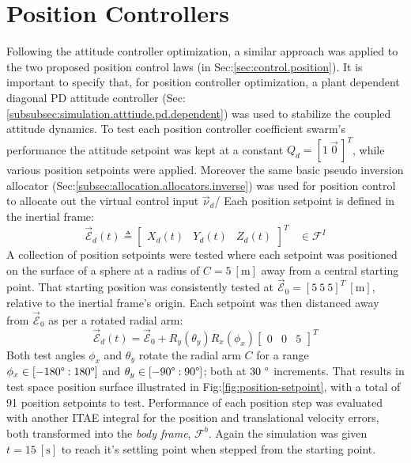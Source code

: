 \section{Position Controllers}
\label{sec:simulation.position}
Following the attitude controller optimization, a similar approach was applied to the two proposed position control laws (in Sec:\ref{sec:control.position}). It is important to specify that, for position controller optimization, a plant dependent diagonal PD attitude controller (Sec:\ref{subsubsec:simulation.atttiude.pd.dependent}) was used to stabilize the coupled attitude dynamics. To test each position controller coefficient swarm's performance the attitude setpoint was kept at a constant $Q_d=[1~\vec{0}\hspace{2pt}]^T$, while various position setpoints were applied. Moreover the same basic pseudo inversion allocator (Sec:\ref{subsec:allocation.allocators.inverse}) was used for position control to allocate out the virtual control input $\vec{\nu}_d$/ Each position setpoint is defined in the inertial frame:
\begin{equation}
\vec{\mathcal{E}}_d(t)\triangleq\begin{bmatrix}
X_d(t)&
Y_d(t)&
Z_d(t)
\end{bmatrix}^T
~~~~\in\mathcal{F}^{I}
\end{equation}
A collection of position setpoints were tested where each setpoint was positioned on the surface of a sphere at a radius of $C=5~[\text{m}]$ away from a central starting point. That starting position was consistently tested at $\vec{\mathcal{E}}_0=[5~5~5]^{T}~[\text{m}]$, relative to the inertial frame's origin. Each setpoint was then distanced away from $\vec{\mathcal{E}}_0$ as per a rotated radial arm:
\begin{equation}
\vec{\mathcal{E}}_d(t)=\vec{\mathcal{E}}_0+R_y(\theta_{y})R_x(\phi_{x})\begin{bmatrix}
0 & 0 & 5
\end{bmatrix}^T
\end{equation}
Both test angles $\phi_x$ and $\theta_y$ rotate the radial arm  $C$ for a range $\phi_x\in[-180\text{\textdegree}:180\text{\textdegree}]$ and $\theta_y\in[-90\text{\textdegree}:90\text{\textdegree}]$; both at $30~\text{\textdegree}$ increments. That results in test space position surface illustrated in Fig:\ref{fig:position-setpoint}, with a total of 91 position setpoints to test. Performance of each position step was evaluated with another ITAE integral for the position and translational velocity errors, both transformed into the \emph{body frame}, $\mathcal{F}^{b}$. Again the simulation was given $t=15~[\text{s}]$ to reach it's settling point when stepped from the starting point.
